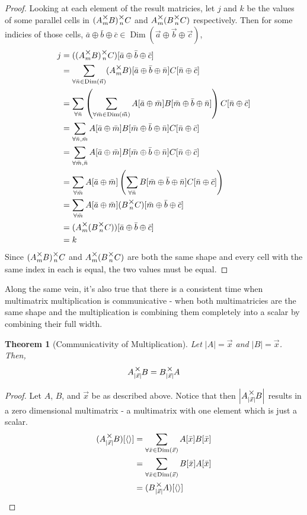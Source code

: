 \documentclass[12pt]{book}
\theoremstyle{plain}
\newtheorem{theorem}{Theorem}[chapter]
\theoremstyle{definition}
\theoremstyle{ppart}
\theoremstyle{case}
\theoremstyle{solution}
\DeclareMathOperator{\Dim}{Dim}
\newcommand{\mmult}[1]{\text{\raisebox{1ex}{$\underset{#1}{\times}$}}}
\newcommand{\shape}[1]{\left|#1\right|}
\begin{document}
\begin{proof}
Looking at each element of the result matricies, let $j$ and $k$ be the values
of some parallel cells in $(A \mmult{m} B) \mmult{n} C$ and
$A \mmult{m} (B \mmult{n} C)$ respectively. Then for some indicies of those cells,
$\bar{a} \oplus \bar{b} \oplus \bar{c} \in
\Dim(\vec{a} \oplus \vec{b} \oplus \vec{c})$,
\begin{align*}
 j
 &= ((A \mmult{m} B) \mmult{n} C)[\bar{a} \oplus \bar{b} \oplus \bar{c}] \\
 &= \sum_{\forall \bar{n} \in \Dim(\vec{n})}
 (A \mmult{m} B)[\bar{a} \oplus \bar{b} \oplus \bar{n}]
 C[\bar{n} \oplus \bar{c}] \\
 &= \sum_{\forall \bar{n}}
 \left(
  \sum_{\forall \bar{m} \in \Dim(\vec{m})}
  A[\bar{a} \oplus \bar{m}]B[\bar{m} \oplus \bar{b} \oplus \bar{n}]
 \right)
 C[\bar{n} \oplus \bar{c}] \\
 &= \sum_{\forall \bar{n}, \bar{m}}
 A[\bar{a} \oplus \bar{m}]
 B[\bar{m} \oplus \bar{b} \oplus \bar{n}]
 C[\bar{n} \oplus \bar{c}] \\
 &= \sum_{\forall \bar{m}, \bar{n}}
 A[\bar{a} \oplus \bar{m}]
 B[\bar{m} \oplus \bar{b} \oplus \bar{n}]
 C[\bar{n} \oplus \bar{c}] \\
 &= \sum_{\forall \bar{m}}
 A[\bar{a} \oplus \bar{m}]
 \left(
 \sum_{\forall \bar{n}}
  B[\bar{m} \oplus \bar{b} \oplus \bar{n}]
  C[\bar{n} \oplus \bar{c}]
 \right) \\
 &= \sum_{\forall \bar{m}}
 A[\bar{a} \oplus \bar{m}]
 (B \mmult{n} C)[\bar{m} \oplus \bar{b} \oplus \bar{c}] \\
 &= (A \mmult{m} (B \mmult{n} C))[\bar{a} \oplus \bar{b} \oplus \bar{c}] \\
 &= k
\end{align*}
Since $(A \mmult{m} B) \mmult{n} C$ and $A \mmult{m} (B \mmult{n} C)$ are both
the same shape and every cell with the same index in each is equal, the two
values must be equal.
\end{proof}

Along the same vein, it's also true that there is a consistent time when
multimatrix multiplication is communicative - when both multimatricies are
the same shape and the multiplication is combining them completely into a
scalar by combining their full width.

\begin{theorem}[Communicativity of Multiplication]
Let $\shape{A} = \vec{x}$ and $\shape{B} = \vec{x}$. Then,
\[ A \mmult{\shape{\vec{x}}} B = B \mmult{\shape{\vec{x}}} A \]
\end{theorem}
\begin{proof}
Let $A$, $B$, and $\vec{x}$ be as described above. Notice that then $\shape{A \mmult{\shape{\vec{x}}} B}$
results in a zero dimensional multimatrix - a multimatrix with one element which is just a scalar.
\begin{align*}
(A \mmult{\shape{\vec{x}}} B)[\left<\right>]
  &= \sum_{\forall \bar{x} \in \Dim(\vec{x})} A[\bar{x}]B[\bar{x}] \\
  &= \sum_{\forall \bar{x} \in \Dim(\vec{x})} B[\bar{x}]A[\bar{x}] \\
  &= (B \mmult{\shape{\vec{x}}} A)[\left<\right>]
\end{align*}
\end{proof}
\end{document}
